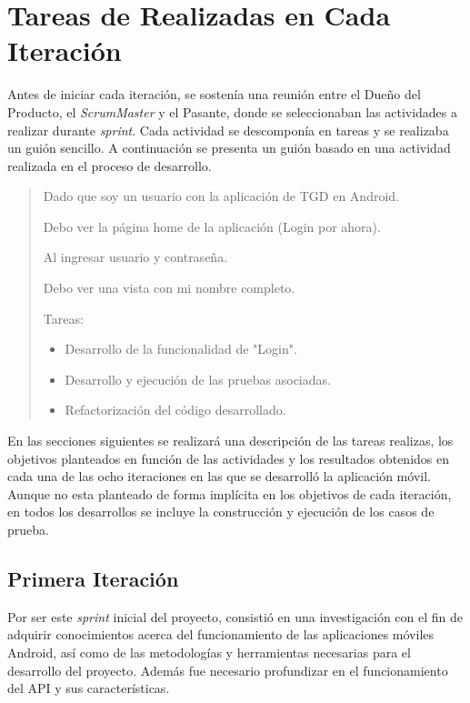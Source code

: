 \section{Tareas de Realizadas en Cada Iteración}

Antes de iniciar cada iteración, se sostenía una reunión entre el Dueño del Producto, el \textit{ScrumMaster} y el Pasante, donde se seleccionaban las actividades a realizar durante \textit{sprint}. Cada actividad se descomponía en tareas y se realizaba un guión sencillo. A continuación se presenta un guión basado en una actividad realizada en el proceso de desarrollo.

\begin{quotation}

Dado que soy un usuario con la aplicación de TGD en Android.
 
Debo ver la página home de la aplicación (Login por ahora).

Al ingresar usuario y contraseña. 

Debo ver una vista con mi nombre completo. 

Tareas: 
\begin{itemize}
\item Desarrollo de la funcionalidad de "Login".
\item Desarrollo y ejecución de las pruebas asociadas.
\item Refactorización del código desarrollado.
\end{itemize}
\end{quotation}

En las secciones siguientes se realizará una descripción de las tareas realizas, los objetivos planteados en función de las actividades y los resultados obtenidos en cada una de las ocho iteraciones en las que se desarrolló la aplicación móvil. Aunque no esta planteado de forma implícita en los objetivos de cada iteración, en todos los desarrollos se incluye la construcción y ejecución de los casos de prueba.

\subsection{Primera Iteración}

Por ser este \textit{sprint} inicial del proyecto, consistió en una investigación con el fin de adquirir conocimientos acerca del funcionamiento de las aplicaciones móviles Android, así como de las metodologías y herramientas necesarias para el desarrollo del proyecto. Además fue necesario profundizar en el funcionamiento del API y sus características.

